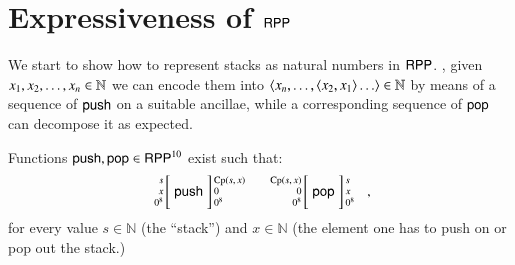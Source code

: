 \section{Expressiveness of $ \mathsf{RPP} $}
\label{section:Completeness of RPP}

We start to show how to represent stacks as natural numbers in $ \mathsf{RPP} $.
\Ie, given $ x_1, x_2, \ldots, x_n  \in \mathbb{N}$
we can encode them into $ \langle   x_n, \ldots, \langle x_2, x_1 \rangle \ldots \rangle \in \mathbb{N}$
by means of a sequence of $ \mathsf{push}$ on a suitable ancillae, while a corresponding
sequence of $ \mathsf{pop} $ can decompose it as expected.

\begin{proposition}
\label{proposition:Representing stacks in RPP}
Functions $ \mathsf{push}, \mathsf{pop}\in\mathsf{RPP}^{10}$ exist such that:
\begin{align*}
\arraycolsep=1.4pt
\begin{array}{rcl}
 \left. {\scriptsize \begin{array}{r} 
                       s\\ x\\ 0^{8}
                     \end{array}} \right[
 & \rprPush &
 \left] {\scriptsize \begin{array}{l}
                       \CP(s,x)\\ 0\\ 0^{8}
                     \end{array} } \right.
\end{array}
&&
\arraycolsep=1.4pt
\begin{array}{rcl}
 \left. {\scriptsize \begin{array}{r} 
                       \CP(s,x)\\ 0\\ 0^{8}
                     \end{array}} \right[
 & \rprPop &
 \left] {\scriptsize \begin{array}{l}
                       s\\ x\\ 0^{8}
                     \end{array} } \right.
\end{array}
\enspace ,
\end{align*}
for every value $ s \in\mathbb{N}$ (the ``stack'') and $ x \in\mathbb{N}$ (the element 
one has to push on or pop out the stack.)
\end{proposition}
